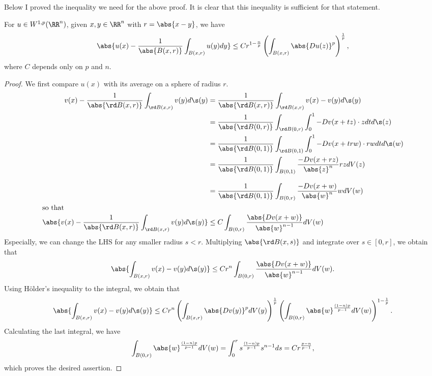 \documentclass[a4paper]{amsart}
\begin{document}
Below I proved the inequality we need for the above proof.
It is clear that this inequality is sufficient for that statement. 
\begin{lem*}
    For \(u\in W^{1, p}(\RR^n)\), given \(x, y\in \RR^n\) with \(r = \abs{x-y}\), we have 
    \[
        \abs{u(x)-\frac{1}{\abs{B(x, r)}}\int_{B(x, r)}u(y)dy}
        \le Cr^{1-\frac{n}{p}}\left(\int_{B(x, r)}\abs{Du(z)}^p\right)^{\frac{1}{p}},
    \]
    where \(C\) depends only on \(p\) and \(n\). 
\end{lem*}
\begin{proof}
    We first compare \(u(x)\) with its average on a sphere of radius \(r\). 
    \begin{align*}
        v(x) - \frac{1}{\abs{\rd B(x, r)}}\int_{\rd B(x, r)} v(y) d\s(y) 
        &= \frac{1}{\abs{\rd B(x, r)}}\int_{\rd B(x, r)} v(x) - v(y) d\s(y) \\
        &= \frac{1}{\abs{\rd B(0, r)}}\int_{\rd B(0, r)}\int_0^1 -Dv(x+tz)\cdot z dtd\s(z) \\
        &= \frac{1}{\abs{\rd B(0, 1)}}\int_{\rd B(0, 1)}\int_0^1 -Dv(x+trw)\cdot rw dtd\s(w) \\
        &= \frac{1}{\abs{\rd B(0, 1)}}\int_{B(0, 1)} \frac{-Dv(x+rz)}{\abs{z}^n}rz dV(z) \\
        \intertext{}
        &= \frac{1}{\abs{\rd B(0, 1)}}\int_{B(0, r)} \frac{-Dv(x+w)}{\abs{w}^n}w dV(w) \\
        \intertext{so that }
        \abs{v(x) - \frac{1}{\abs{\rd B(x, r)}}\int_{\rd B(x, r)} v(y) d\s(y)}
        &\le C\int_{B(0, r)} \frac{\abs{Dv(x+w)}}{\abs{w}^{n-1}} dV(w) 
    \end{align*}
    Especially, we can change the LHS for any smaller radius \(s < r\).
    Multiplying \(\abs{\rd B(x, s)}\) and integrate over \(s\in [0, r]\), we obtain that 
    \[
        \abs{\int_{B(x, r)}v(x)-v(y)d\s(y)}
        \le Cr^n \int_{B(0, r)} \frac{\abs{Dv(x+w)}}{\abs{w}^{n-1}} dV(w).
    \]
    Using H\"older's inequality to the integral, we obtain that 
    \[
        \abs{\int_{B(x, r)}v(x)-v(y)d\s(y)}
        \le Cr^n \left(\int_{B(x, r)}\abs{Dv(y)}^p dV(y)\right)^{\frac{1}{p}}\left(\int_{B(0, r)}\abs{w}^{\frac{(1-n)p}{p-1}} dV(w)\right)^{1-\frac{1}{p}}.
    \]
    Calculating the last integral, we have 
    \[
        \int_{B(0, r)}\abs{w}^{\frac{(1-n)p}{p-1}} dV(w)
        = \int_0^r s^{\frac{(1-n)p}{p-1}}s^{n-1} ds = Cr^{\frac{p-n}{p-1}},
    \]
    which proves the desired assertion. 
\end{proof}
\end{document}

